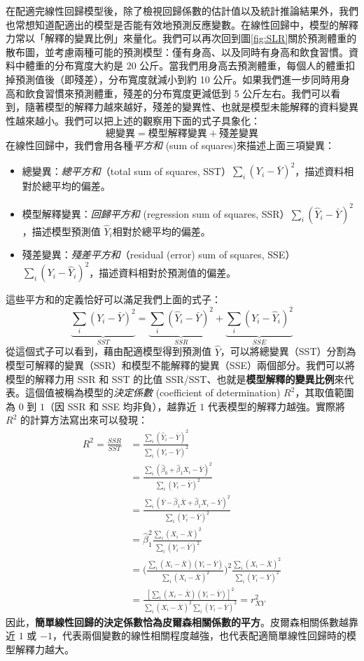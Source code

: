     在配適完線性回歸模型後，除了檢視回歸係數的估計值以及統計推論結果外，我們也常想知道配適出的模型是否能有效地預測反應變數。在線性回歸中，模型的解釋力常以「解釋的變異比例」來量化。我們可以再次回到圖\ref{fig:SLR}關於預測體重的散布圖，並考慮兩種可能的預測模型：僅有身高、以及同時有身高和飲食習慣。資料中體重的分布寬度大約是 20 公斤。當我們用身高去預測體重，每個人的體重扣掉預測值後（即殘差），分布寬度就減小到約 10 公斤。如果我們進一步同時用身高和飲食習慣來預測體重，殘差的分布寬度更減低到 5 公斤左右。我們可以看到，隨著模型的解釋力越來越好，殘差的變異性、也就是模型未能解釋的資料變異性越來越小。我們可以把上述的觀察用下面的式子具象化：
    \smallskip
    \[\text{總變異}  = \text{模型解釋變異} + \text{殘差變異}\]
    \smallskip
    在線性回歸中，我們會用各種\textit{平方和} (sum of squares)來描述上面三項變異：
    \begin{itemize}
        \item 總變異：\textit{總平方和}（total sum of squares, SST）$\sum_i (Y_i - \bar{Y})^2$，描述資料相對於總平均的偏差。
        \item 模型解釋變異：\textit{回歸平方和} (regression sum of squares, SSR）$\sum_i (\hat{Y}_i - \bar{Y})^2$，描述模型預測值 $\hat{Y}_i$相對於總平均的偏差。
        \item 殘差變異：\textit{殘差平方和}（residual (error) sum of squares, SSE）$\sum_i (Y_i - \hat{Y}_i)^2$，描述資料相對於預測值的偏差。
    \end{itemize}
    這些平方和的定義恰好可以滿足我們上面的式子：
    \smallskip
    \[\underbrace{\sum_i (Y_i - \bar{Y})^2}_{SST} = \underbrace{\sum_i (\hat{Y}_i - \bar{Y})^2}_{SSR} + \underbrace{\sum_i (Y_i - \hat{Y}_i)^2}_{SSE}\]
    \smallskip
    從這個式子可以看到，藉由配適模型得到預測值 $\hat{Y}$，可以將總變異（SST）分割為模型可解釋的變異（SSR）和模型不能解釋的變異（SSE）兩個部分。我們可以將模型的解釋力用 SSR 和 SST 的比值 SSR/SST、也就是\textbf{模型解釋的變異比例}來代表。這個值被稱為模型的\textit{決定係數} (coefficient of determination) $R^2$，其取值範圍為 $0$ 到 $1$（因 SSR 和 SSE 均非負），越靠近 $1$ 代表模型的解釋力越強。實際將 $R^2$ 的計算方法寫出來可以發現：
    \smallskip
    \begin{align*}
        R^2 = \frac{SSR}{SST} &= \frac{\sum_i (\hat{Y}_i-\bar{Y})^2}{\sum_i (Y_i - \bar{Y})^2}\\
        &= \frac{\sum_i (\hat{\beta}_0 + \hat{\beta}_1 X_i -\bar{Y})^2}{\sum_i (Y_i - \bar{Y})^2}\\
        &= \frac{\sum_i (\bar{Y} - \hat{\beta}_1 \bar{X}+ \hat{\beta}_1 X_i -\bar{Y})^2}{\sum_i (Y_i - \bar{Y})^2}\\
        &= \hat{\beta}_1^2 \frac{\sum_i (X_i - \bar{X})^2}{\sum_i (Y_i - \bar{Y})^2}\\
        &= \Big(\frac{\sum_i (X_i-\bar{X})(Y_i-\bar{Y})}{\sum_i (X_i-\bar{X})^2}\Big)^2 \frac{\sum_i (X_i - \bar{X})^2}{\sum_i (Y_i - \bar{Y})^2} \\
        &= \frac{[\sum_i (X_i-\bar{X})(Y_i-\bar{Y})]^2}{\sum_i (X_i - \bar{X})^2\sum_i (Y_i - \bar{Y})^2} = r_{XY}^2
    \end{align*}
    \smallskip
    因此，\textbf{簡單線性回歸的決定係數恰為皮爾森相關係數的平方}。皮爾森相關係數越靠近 $1$ 或 $-1$，代表兩個變數的線性相關程度越強，也代表配適簡單線性回歸時的模型解釋力越大。

